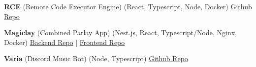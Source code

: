 

  
\begin{cvparagraph}
  \textbf{RCE} (Remote Code Executor Engine) (React, Typescript, Node, Docker) \href{https://github.com/collinkleest/rce}{Github Repo}
  
  \textbf{Magiclay} (Combined Parlay App) (Nest.js, React, Typescript/Node, Nginx, Docker) \href{https://github.com/collinkleest/magiclay.webservice}{Backend Repo} | \href{https://github.com/collinkleest/magiclay.webapp}{Frontend Repo}
  
  \textbf{Varia} (Discord Music Bot) (Node, Typescript)  \href{https://github.com/collinkleest/varia}{Github Repo}

\end{cvparagraph}
